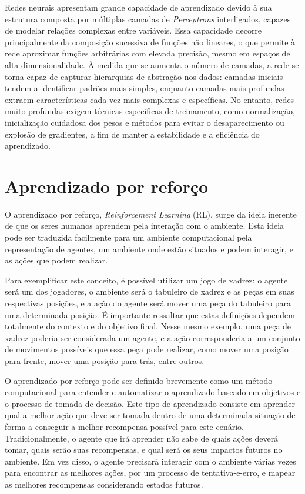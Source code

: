 Redes neurais apresentam grande capacidade de aprendizado devido à sua estrutura composta por múltiplas camadas de \textit{Perceptrons}
interligados, capazes de modelar relações complexas entre variáveis. Essa capacidade decorre principalmente da composição sucessiva 
de funções não lineares, o que permite à rede aproximar funções arbitrárias com elevada precisão, mesmo em espaços de alta dimensionalidade.
À medida que se aumenta o número de camadas, a rede se torna capaz de capturar hierarquias de abstração nos dados: 
camadas iniciais tendem a identificar padrões mais simples, enquanto camadas mais profundas extraem características cada vez 
mais complexas e específicas. No entanto, redes muito profundas exigem técnicas específicas de treinamento, 
como normalização, inicialização cuidadosa dos pesos e métodos para evitar o desaparecimento ou explosão de gradientes, 
a fim de manter a estabilidade e a eficiência do aprendizado.



\section{Aprendizado por reforço}
O aprendizado por reforço, \textit{Reinforcement Learning} (RL), surge da ideia inerente de que os
seres humanos aprendem pela interação com o ambiente. Esta ideia pode ser traduzida facilmente para um
ambiente computacional pela representação de agentes, um ambiente onde estão situados e podem interagir,
e as ações que podem realizar. 

Para exemplificar este conceito, é possível utilizar um jogo de xadrez: o agente será
um dos jogadores, o ambiente será o tabuleiro de xadrez e as peças em suas respectivas posições,
e a ação do agente será mover uma peça do tabuleiro para uma determinada posição. É importante
ressaltar que estas definições dependem totalmente do contexto e do objetivo final. Nesse 
mesmo exemplo, uma peça de xadrez poderia ser considerada um agente, e a ação
corresponderia a um conjunto de movimentos possíveis que essa peça pode realizar, 
como mover uma posição para frente, mover uma posição para trás, entre outros.

O aprendizado por reforço pode ser definido brevemente como um método computacional para entender e
automatizar o aprendizado baseado em objetivos e o processo de tomada de decisão.
Este tipo de aprendizado consiste em
aprender qual a melhor ação que deve ser tomada dentro de uma determinada situação de forma
a conseguir a melhor recompensa possível para este cenário. Tradicionalmente, o agente que irá 
aprender não sabe de quais ações deverá tomar, quais serão suas recompensas, e qual será os seus impactos
futuros no ambiente. Em vez disso, o agente precisará interagir com o ambiente várias vezes para encontrar
as melhores ações, por um processo de tentativa-e-erro, e mapear as melhores recompensas considerando
estados futuros.

